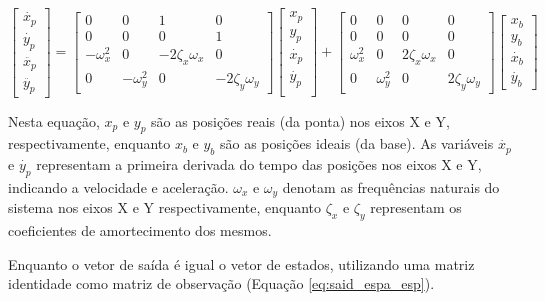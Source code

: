 \begin{equation}
    \label{eq:espaco_de_estados_din_model}
    \begin{bmatrix}
        \dot{x_p} \\
        \dot{y_p} \\
        \ddot{x_p} \\
        \ddot{y_p}
    \end{bmatrix}
    =
    \begin{bmatrix}
        0 & 0 & 1 & 0 \\
        0 & 0 & 0 & 1 \\
        -\omega _x ^2 & 0 & -2 \zeta _x \omega _x & 0 \\
        0 & -\omega _y ^2 & 0 & -2 \zeta _y \omega _y
    \end{bmatrix}
    \begin{bmatrix}
        x_p \\    
        y_p \\
        \dot{x_p} \\    
        \dot{y_p} \\
    \end{bmatrix}
    +
    \begin{bmatrix}
        0 & 0 & 0 & 0 \\
        0 & 0 & 0 & 0 \\
        \omega _x ^2 & 0 & 2 \zeta _x \omega _x & 0 \\
        0 & \omega _y ^2 & 0 & 2 \zeta _y \omega _y
    \end{bmatrix}
    \begin{bmatrix}
        x_b \\
        y_b \\
        \dot{x_b}  \\
        \dot{y_b} 
    \end{bmatrix}
\end{equation}

Nesta equação, \(x_p\) e \(y_p\) são as posições reais (da ponta) nos eixos X e Y, respectivamente, enquanto \(x_b\) e \(y_b\) são as posições ideais (da base). As variáveis \(\dot{x_p}\) e \(\dot{y_p}\) representam a primeira derivada do tempo das posições nos eixos X e Y, indicando a velocidade e aceleração. \(\omega _x\) e \(\omega _y\) denotam as frequências naturais do sistema nos eixos X e Y respectivamente, enquanto \(\zeta _x\) e \(\zeta _y\) representam os coeficientes de amortecimento dos mesmos.

Enquanto o vetor de saída é igual o vetor de estados, utilizando uma matriz identidade como matriz de observação (Equação \ref{eq:said_espa_esp}).

